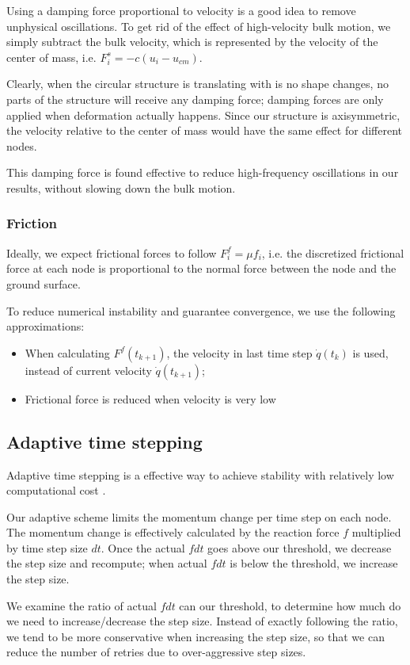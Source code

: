 \documentclass[letterpaper,9pt]{article}
\begin{document}
\begin{multicols}{2}
				Using a damping force proportional to velocity is a good idea to remove unphysical oscillations. To get rid of the effect of high-velocity bulk motion, we simply subtract the bulk velocity, which is represented by the velocity of the center of mass, i.e. $F_i^s = -c(u_{i} - u_{cm})$.
				
				Clearly, when the circular structure is translating with is no shape changes, no parts of the structure will receive any damping force; damping forces are only applied when deformation actually happens. Since our structure is axisymmetric, the velocity relative to the center of mass would have the same effect for different nodes. 
				
				This damping force is found effective to reduce high-frequency oscillations in our results, without slowing down the bulk motion.
			\subsubsection{Friction}
				Ideally, we expect frictional forces to follow $F_i^f = \mu f_i$, i.e. the discretized frictional force at each node is proportional to the normal force between the node and the ground surface.
				
				To reduce numerical instability and guarantee convergence, we use the following approximations:
				\begin{itemize}
					\item When calculating $F^f(t_{k+1})$, the velocity in last time step $\dot q(t_k)$ is used, instead of current velocity $\dot q(t_{k+1})$;
					\item Frictional force is reduced when velocity is very low
				\end{itemize}
		\subsection{Adaptive time stepping}
			Adaptive time stepping is a effective way to achieve stability with relatively low computational cost \cite{Soderlind06}.
			
			Our adaptive scheme limits the momentum change per time step on each node. The momentum change is effectively calculated by the reaction force $f$ multiplied by time step size $dt$. Once the actual $fdt$ goes above our threshold, we decrease the step size and recompute; when actual $fdt$ is below the threshold, we increase the step size. 
			
			We examine the ratio of actual $fdt$ can our threshold, to determine how much do we need to increase/decrease the step size. Instead of exactly following the ratio, we tend to be more conservative when increasing the step size, so that we can reduce the number of retries due to over-aggressive step sizes.		

\end{multicols}
\end{document}
